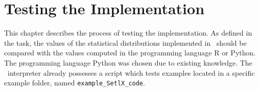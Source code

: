 
\chapter{Testing the Implementation}

	This chapter describes the process of testing the implementation. As defined in the task, the values of the statistical distributions implemented in \setlx\ should be compared with the values computed in the programming language R or Python. The programming language Python was chosen due to existing knowledge. The \setlx\ interpreter already possesses a script which tests examples located in a specific example folder, named \lstinline{example_SetlX_code}.